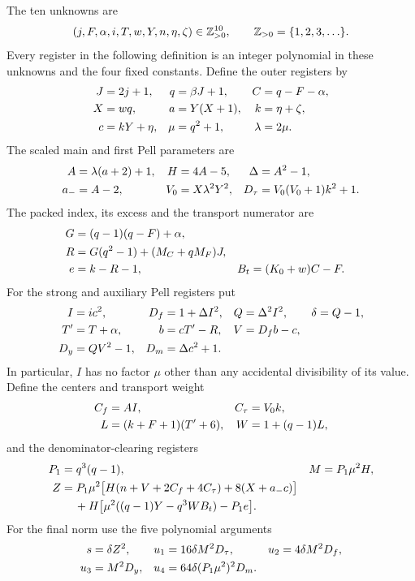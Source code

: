 The ten unknowns are
\begin{equation}
 (j,F,\alpha,i,T,w,Y,n,\eta,\zeta)\in\mathbb Z_{>0}^{10},
 \qquad \mathbb Z_{>0}=\{1,2,3,\ldots\}.
 \label{dy:variables}
\end{equation}
Every register in the following definition is an integer polynomial in
these unknowns and the four fixed constants.  Define the outer registers
by
\begin{align}
 J&=2j+1,& q&=\beta J+1,& C&=q-F-\alpha, \notag\\
 X&=wq,& a&=Y(X+1),& k&=\eta+\zeta, \notag\\
 c&=kY+\eta,& \mu&=q^2+1,& \lambda&=2\mu.
 \label{dy:outer}
\end{align}
The scaled main and first Pell parameters are
\begin{align}
 A&=\lambda(a+2)+1,& H&=4A-5,& \Delta&=A^2-1, \notag\\
 a_-&=A-2,& V_0&=X\lambda^2Y^2,&
 D_\tau&=V_0(V_0+1)k^2+1.
 \label{dy:parameters}
\end{align}
The packed index, its excess and the transport numerator are
\begin{align}
 G&=(q-1)(q-F)+\alpha, \notag\\
 R&=G(q^2-1)+(M_C+qM_F)J, \notag\\
 e&=k-R-1, & B_t&=(K_0+w)C-F.
 \label{dy:index}
\end{align}
For the strong and auxiliary Pell registers put
\begin{align}
 I&=ic^2,& D_f&=1+\Delta I^2,& Q&=\Delta^2I^2,
       &\delta&=Q-1, \notag\\
 T'&=T+\alpha,& b&=cT'-R,& V&=D_fb-c, \notag\\
 D_y&=QV^2-1,& D_m&=\Delta c^2+1.
 \label{dy:auxiliary}
\end{align}
In particular, $I$ has no factor $\mu$ other than any accidental
divisibility of its value.  Define the centers and transport weight
\begin{align}
 C_f&=AI,& C_\tau&=V_0k, \notag\\
 L&=(k+F+1)(T'+6),& W&=1+(q-1)L,
 \label{dy:weight}
\end{align}
and the denominator-clearing registers
\begin{align}
 P_1&=q^3(q-1),& M&=P_1\mu^2H, \notag\\
 Z&=P_1\mu^2\bigl[H(n+V+2C_f+4C_\tau)+8(X+a_-c)\bigr]
       \notag\\
  &\hspace{1.2em}+H\bigl[\mu^2((q-1)Y-q^3WB_t)-P_1e\bigr].
 \label{dy:carrier}
\end{align}
For the final norm use the five polynomial arguments
\begin{align}
 s&=\delta Z^2,&
 u_1&=16\delta M^2D_\tau,&
 u_2&=4\delta M^2D_f, \notag\\
 u_3&=M^2D_y,&
 u_4&=64\delta(P_1\mu^2)^2D_m.
 \label{dy:normargs}
\end{align}


